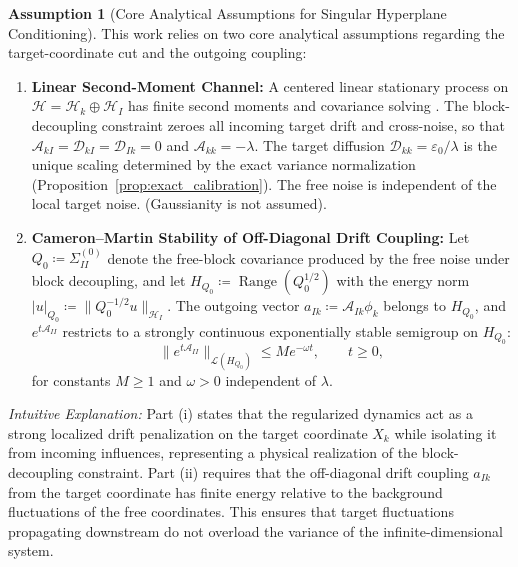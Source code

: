 \documentclass[11pt]{amsart}
\theoremstyle{plain}
\theoremstyle{definition}
\newtheorem{assumption}[theorem]{Assumption}
\theoremstyle{remark}
\begin{document}
    \begin{assumption}[Core Analytical Assumptions for Singular Hyperplane Conditioning]
        This work relies on two core analytical assumptions regarding the target-coordinate cut and the outgoing coupling:
        \begin{enumerate}
            \item[(i)] \textbf{Linear Second-Moment Channel:} \label{assum:linear_second_moment} A centered linear stationary process on $\mathcal{H}=\mathcal{H}_k\oplus \mathcal{H}_I$ has finite second moments and covariance solving . The block-decoupling constraint zeroes all incoming target drift and cross-noise, so that $\mathcal{A}_{kI}=\mathcal{D}_{kI}=\mathcal{D}_{Ik}=0$ and $\mathcal{A}_{kk}=-\lambda$. The target diffusion $\mathcal{D}_{kk}=\varepsilon_0/\lambda$ is the unique scaling determined by the exact variance normalization (Proposition~\ref{prop:exact_calibration}). The free noise is independent of the local target noise. (Gaussianity is not assumed).
            \item[(ii)] \textbf{Cameron--Martin Stability of Off-Diagonal Drift Coupling:} \label{assum:cm_stability} Let $Q_0\coloneqq\Sigma_{II}^{(0)}$ denote the free-block covariance produced by the free noise under block decoupling, and let $H_{Q_0}\coloneqq\operatorname{Range}(Q_0^{1/2})$ with the energy norm $|u|_{Q_0}\coloneqq\|Q_0^{-1/2}u\|_{\mathcal{H}_I}$. The outgoing vector $a_{Ik}\coloneqq\mathcal{A}_{Ik}\phi_k$ belongs to $H_{Q_0}$, and $e^{t\mathcal{A}_{II}}$ restricts to a strongly continuous exponentially stable semigroup on $H_{Q_0}$:
            \begin{equation}
                \|e^{t\mathcal{A}_{II}}\|_{\mathcal{L}(H_{Q_0})} \le M e^{-\omega t},\qquad t\ge0,
            \end{equation}
            for constants $M\ge1$ and $\omega>0$ independent of $\lambda$.
        \end{enumerate}
        \vspace{1mm}
        \noindent\textit{Intuitive Explanation:} Part (i) states that the regularized dynamics act as a strong localized drift penalization on the target coordinate $X_k$ while isolating it from incoming influences, representing a physical realization of the block-decoupling constraint. Part (ii) requires that the off-diagonal drift coupling $a_{Ik}$ from the target coordinate has finite energy relative to the background fluctuations of the free coordinates. This ensures that target fluctuations propagating downstream do not overload the variance of the infinite-dimensional system.
    \end{assumption}
\end{document}
